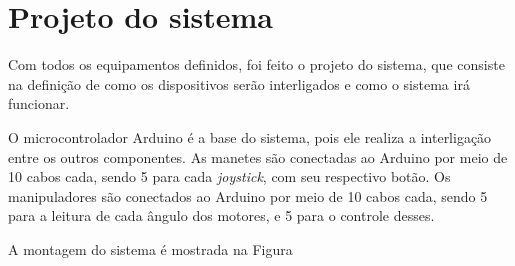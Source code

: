 \section[Projeto do sistema]{Projeto do sistema}

Com todos os equipamentos definidos, foi feito o projeto do sistema, que consiste na definição de como os dispositivos serão interligados e como o sistema irá funcionar.

O microcontrolador Arduino é a base do sistema, pois ele realiza a interligação entre os outros componentes.
As manetes são conectadas ao Arduino por meio de 10 cabos cada, sendo 5 para cada \textit{joystick}, com seu respectivo botão.
Os manipuladores são conectados ao Arduino por meio de 10 cabos cada, sendo 5 para a leitura de cada ângulo dos motores, e 5 para o controle desses.

A montagem do sistema é mostrada na Figura %



